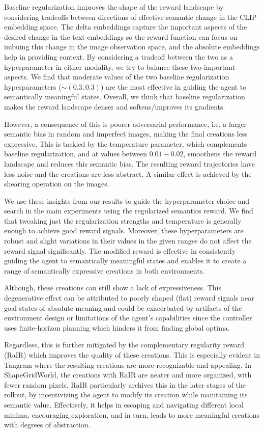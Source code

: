 Baseline regularization improves the shape of the reward landscape by considering tradeoffs between directions of effective semantic change in the CLIP embedding space.
The delta embeddings capture the important aspects of the desired change in the text embeddings so the reward function can focus on imbuing this change in the image observation space, and the absolute embeddings help in providing context.
By considering a tradeoff between the two as a hyperparameter in either modality, we try to balance these two important aspects.
We find that moderate values of the two baseline regularization hyperparameters (\(\sim (0.3, 0.3)\)) are the most effective in guiding the agent to semantically meaningful states.
Overall, we think that baseline regularization makes the reward landscape denser and softens/improves its gradients.

However, a consequence of this is poorer adversarial performance, i.e. a larger semantic bias in random and imperfect images, making the final creations less expressive.
This is tackled by the temperature parameter, which complements baseline regularization, and at values between \(0.01 - 0.02\), smoothens the reward landscape and reduces this semantic bias.
The resulting reward trajectories have less noise and the creations are less abstract.
A similar effect is achieved by the shearing operation on the images.

We use these insights from our results to guide the hyperparameter choice and search in the main experiments using the regularized semantics reward.
We find that tweaking just the regularization strengths and temperature is generally enough to achieve good reward signals.
Moreover, these hyperparameters are robust and slight variations in their values in the given ranges do not affect the reward signal significantly.
The modified reward is effective in consistently guiding the agent to semantically meaningful states and enables it to create a range of semantically expressive creations in both environments.

Although, these creations can still show a lack of expressiveness.
This degenerative effect can be attributed to poorly shaped (flat) reward signals near goal states of absolute meaning and could be exacerbated by artifacts of the environment design or limitations of the agent's capabilities since the controller uses finite-horizon planning which hinders it from finding global optima.

Regardless, this is further mitigated by the complementary regularity reward (RaIR) which improves the quality of these creations.
This is especially evident in Tangram where the resulting creations are more recognizable and appealing.
In ShapeGridWorld, the creations with RaIR are neater and more organized, with fewer random pixels.
RaIR particularly archives this in the later stages of the rollout, by incentivizing the agent to modify its creation while maintaining its semantic value.
Effectively, it helps in escaping and navigating different local minima, encouraging exploration, and in turn, leads to more meaningful creations with degrees of abstraction.

